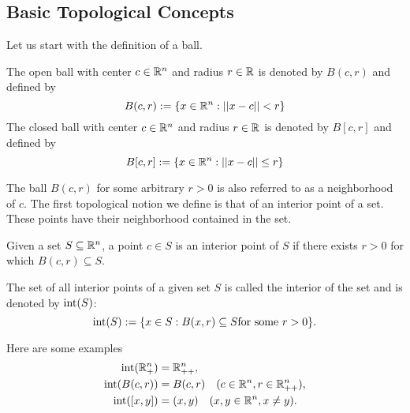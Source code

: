 \documentclass[10pt,a4paper]{article}
\begin{document}
\subsection{Basic Topological Concepts}
Let us start with the definition of a ball.
\begin{definition} The open ball with center $c\in \mathbb{R}^n$ and radius $r \in \mathbb{R}$ is denoted by $B(c,r)$ and defined by 
\begin{equation*}
	B(c,r) := \{x\in\mathbb{R}^n: ||x-c||< r\}
\end{equation*}
The closed ball with center $c\in \mathbb{R}^n$ and radius $r \in \mathbb{R}$ is denoted by $B[c,r]$ and defined by 
\begin{equation*}
B[c,r] := \{x\in\mathbb{R}^n: ||x-c||\leq r\}
\end{equation*}
\end{definition}
The ball $B(c, r)$ for some arbitrary $r>0$ is also referred to as a neighborhood of $c$. The first topological notion we define is that of an interior point of a set. These points have their neighborhood contained in the set.
\begin{definition} Given a set $S \subseteq\mathbb{R}^n$, a point $c\in S$ is an interior point of $S$ if there exists $r>0$ for which $B(c,r) \subseteq S$.
\end{definition}
The set of all interior points of a given set $S$ is called the interior of the set and is denoted by $\text{int}(S)$:
\begin{equation*}
	\text{int}(S) :=\{x\in S: B(x,r)\subseteq S \text{for some } r>0\}.
\end{equation*}
\begin{example}
	Here are some examples 
	\begin{equation*}
		\begin{split}
			\text{int}(\mathbb{R}^n_+) &= \mathbb{R}^n_{++},\\
			\text{int}(B(c,r)) &= B(c,r) \quad (c \in \mathbb{R}^n, r \in \mathbb{R}^n_{++}),\\
			\text{int}([x,y]) &= (x,y)\quad (x,y \in \mathbb{R}^n, x\neq y).
		\end{split}
	\end{equation*}
\end{example}



\end{document}
